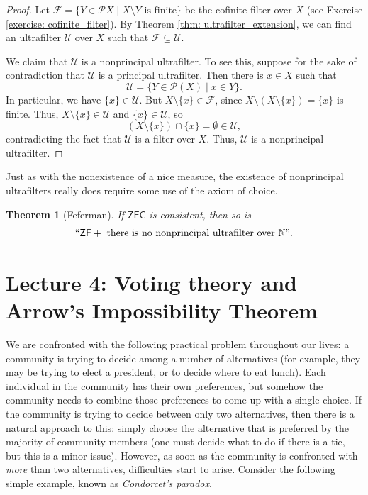 \documentclass[a4paper]{memoir}
\newtheorem{theorem}{Theorem}[section]
\theoremstyle{definition}
\newcommand{\bb}{\mathbb}
\newcommand{\mc}{\mathcal}
\newcommand{\power}{\ensuremath{\mathscr{P}}}
\begin{document}
\begin{proof}
  Let $\mc{F} = \{Y \in \power{X} \mid X \setminus Y \text{ is finite}\}$ be the cofinite 
  filter over $X$ (see Exercise \ref{exercise: cofinite_filter}). By Theorem \ref{thm: ultrafilter_extension}, 
  we can find an ultrafilter $\mc{U}$ over $X$ such that $\mc{F} \subseteq \mc{U}$.
  
  We claim that $\mc{U}$ is a nonprincipal ultrafilter. To see this, suppose for the sake of contradiction 
  that $\mc{U}$ is a principal ultrafilter. Then there is $x \in X$ such that 
  \[
    \mc{U} = \{Y \in \power(X) \mid x \in Y\}.
  \]
  In particular, we have $\{x\} \in \mc{U}$. But $X \setminus \{x\} \in \mc{F}$, since 
  $X \setminus (X \setminus \{x\}) = \{x\}$ is finite. Thus, $X \setminus \{x\} \in \mc{U}$ 
  and $\{x\} \in \mc{U}$, so 
  \[
    (X \setminus \{x\}) \cap \{x\} = \emptyset \in \mc{U},
  \]
  contradicting the fact that $\mc{U}$ is a filter over $X$. Thus, $\mc{U}$ is a nonprincipal 
  ultrafilter.
\end{proof}

Just as with the nonexistence of a nice measure, the existence of nonprincipal ultrafilters really 
does require some use of the axiom of choice.

\begin{theorem}[Feferman]
  If $\mathsf{ZFC}$ is consistent, then so is 
  \[
  ``\mathsf{ZF} + \text{ there is no nonprincipal ultrafilter over }\bb{N}".
  \]
\end{theorem}

\chapter{Lecture 4: Voting theory and Arrow's Impossibility Theorem}

We are confronted with the following practical problem throughout our lives: a community 
is trying to decide among a number of alternatives (for example, they may be trying to elect 
a president, or to decide where to eat lunch). Each individual in the community has their 
own preferences, but somehow the community needs to combine those preferences to come up with 
a single choice. If the community is trying to decide between only two alternatives, then 
there is a natural approach to this: simply choose the alternative that is preferred by 
the majority of community members (one must decide what to do if there is a tie, but 
this is a minor issue). However, as soon as the community is confronted with \emph{more} than 
two alternatives, difficulties start to arise. Consider the following simple example, known 
as \emph{Condorcet's paradox}.
\end{document}
